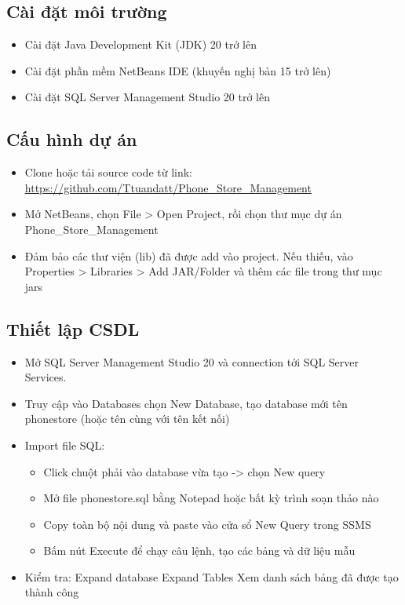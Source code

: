 \documentclass[a4paper,12pt]{report}
\begin{document}
\subsection{Cài đặt môi trường}
\begin{itemize}
    \item Cài đặt Java Development Kit (JDK) 20 trở lên
    \item Cài đặt phần mềm NetBeans IDE (khuyến nghị bản 15 trở lên)
    \item Cài đặt SQL Server Management Studio 20 trở lên
\end{itemize}
\subsection{Cấu hình dự án}
\begin{minipage}[t]{\linewidth}
    \begin{itemize}
        \item Clone hoặc tải source code từ link: \url{https://github.com/Ttuandatt/Phone_Store_Management}
        \item Mở NetBeans, chọn File > Open Project, rồi chọn thư mục dự án Phone\_Store\_Management
        \item Đảm bảo các thư viện (lib) đã được add vào project. Nếu thiếu, vào \\ Properties > Libraries > Add JAR/Folder và thêm các file trong thư mục jars
    \end{itemize}
\end{minipage}

\subsection{Thiết lập CSDL}
\begin{minipage}[t]{\linewidth}
    \begin{itemize}
        \item Mở SQL Server Management Studio 20 và connection tới SQL Server \newline Services.
        \item Truy cập vào Databases \textrightarrow{} chọn New Database, tạo database mới tên phonestore (hoặc tên cùng với tên kết nối)
        \item Import file SQL:
              \begin{itemize}
                  \item Click chuột phải vào database vừa tạo -> chọn New query
                  \item Mở file phonestore.sql bằng Notepad hoặc bất kỳ trình soạn thảo nào
                  \item Copy toàn bộ nội dung và paste vào cửa sổ New Query trong SSMS
                  \item Bấm nút Execute để chạy câu lệnh, tạo các bảng và dữ liệu mẫu
              \end{itemize}
        \item Kiểm tra: Expand database \textrightarrow{} Expand Tables \textrightarrow{} Xem danh sách bảng đã được tạo thành công
    \end{itemize}
\end{minipage}
\end{document}
